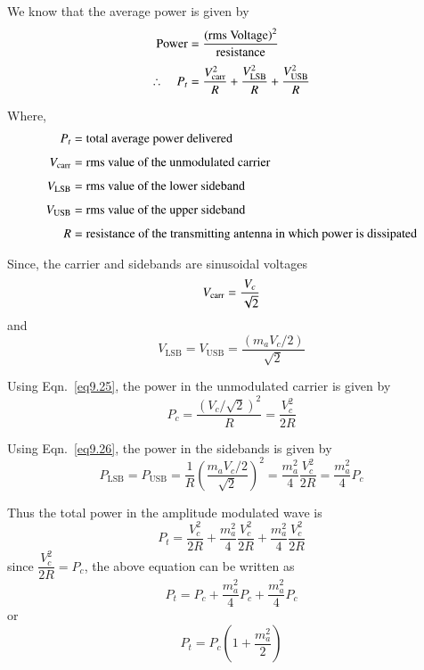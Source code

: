 We know that the average power is given by
\begin{align}
\text{Power} &= \frac{\text{(rms Voltage)}^{2}}{\text{resistance}}\notag\\[3pt]
\therefore\quad P_{t} &= \frac{V^{2}_{\operatorname{carr}}}{R}+\frac{V^{2}_{\text{LSB}}}{R}+\frac{V^{2}_{\text{USB}}}{R}\label{eq9.24}
\end{align}

Where,
\begin{align*}
P_{t} &= \text{total average power delivered}\\[4pt]
V_{\operatorname{carr}} &= \text{rms value of the unmodulated carrier}\\[4pt]
V_{\text{LSB}} &= \text{rms value of the lower sideband}\\[4pt]
V_{\text{USB}} &= \text{rms value of the upper sideband}\\[4pt]
R &= \text{resistance of the transmitting antenna in which power is dissipated}
\end{align*}

Since, the carrier and sidebands are sinusoidal voltages
\begin{equation}
V_{\operatorname{carr}} =\frac{V_{c}}{\sqrt{2}}\label{eq9.25}
\end{equation}
and
\begin{equation}
V_{\text{LSB}}=V_{\text{USB}}=\frac{(m_{a}V_{c}/2)}{\sqrt{2}}\label{eq9.26}
\end{equation}

Using Eqn.~\eqref{eq9.25}, the power in the unmodulated carrier is given by
\begin{equation}
P_{c} = \frac{(V_{c}/\sqrt{2})^{2}}{R}=\frac{V^{2}_{c}}{2R}\label{eq9.27}
\end{equation}

Using Eqn.~\eqref{eq9.26}, the power in the sidebands is given by
\begin{equation}
P_{\text{LSB}}=P_{\text{USB}}=\frac{1}{R}\left(\frac{m_{a}V_{c}/2}{\sqrt{2}}\right)^{2}=\dfrac{m^{2}_{a}}{4}\frac{V^{2}_{c}}{2R}=\frac{m^{2}_{a}}{4}P_{c}\label{eq9.28}
\end{equation}

Thus the total power in the amplitude modulated wave is
\begin{equation}
P_{t}=\frac{V^{2}_{c}}{2R}+\frac{m^{2}_{a}}{4}\frac{V^{2}_{c}}{2R}+\frac{m^{2}_{a}}{4}\frac{V^{2}_{c}}{2R}\label{eq9.29}
\end{equation}
since $\dfrac{V^{2}_{c}}{2R}=P_{c}$, the above equation can be written as
$$
P_{t}=P_{c}+\frac{m^{2}_{a}}{4}P_{c}+\frac{m^{2}_{a}}{4}P_{c}
$$
or
\begin{equation}
P_{t}=P_{c}\left(1+\dfrac{m^{2}_{a}}{2}\right)\label{eq9.30}
\end{equation}


